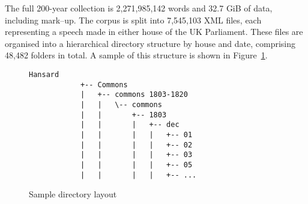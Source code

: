 

The full 200-year collection is 2,271,985,142 words and 32.7%
GiB of data, including mark--up. The corpus is split into 7,545,103 XML files, each representing a speech made in either house of the UK Parliament.  These files are organised into a hierarchical directory structure by house and date, comprising 48,482 folders in total.  A sample of this structure is shown in Figure~\ref{fig:structure}.

\begin{figure}[h]
    \centering
    {
        \small
        \begin{Verbatim}[frame=single]
            Hansard
            +-- Commons
            |   +-- commons 1803-1820
            |   |   \-- commons
            |   |       +-- 1803
            |   |       |   +-- dec
            |   |       |   |   +-- 01
            |   |       |   |   +-- 02
            |   |       |   |   +-- 03
            |   |       |   |   +-- 05
            |   |       |   |   +-- ...
        \end{Verbatim} 
    }
    \caption{Sample directory layout}
    \label{fig:structure}
\end{figure}



